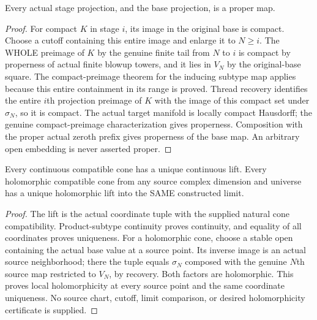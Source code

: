 \begin{theorem}
\label{hir:actual-thread-lf-proper-projections}
\leanok
{}
Every actual stage projection, and the base projection, is a proper map.
\end{theorem}
\begin{proof}
For compact $K$ in stage $i$, its image in the original base is compact.
Choose a cutoff containing this entire image and enlarge it to $N\geq i$.
The WHOLE preimage of $K$ by the genuine finite tail from $N$ to $i$ is compact
by properness of actual finite blowup towers, and it lies in $V_N$ by the
original-base square. The compact-preimage theorem for the inducing subtype
map applies because this entire containment in its range is proved.
Thread recovery identifies the entire $i$th projection preimage of $K$ with
the image of this compact set under $\sigma_N$, so it is compact.
The actual target manifold is locally compact Hausdorff; the genuine
compact-preimage characterization gives properness. Composition with the
proper actual zeroth prefix gives properness of the base map. An arbitrary
open embedding is never asserted proper.
\end{proof}

\begin{theorem}
\label{hir:actual-thread-lf-universal-cones}
\leanok
{}
Every continuous compatible cone has a unique continuous lift. Every
holomorphic compatible cone from any source complex dimension and universe
has a unique holomorphic lift into the SAME constructed limit.
\end{theorem}
\begin{proof}
The lift is the actual coordinate tuple with the supplied natural cone
compatibility. Product-subtype continuity proves continuity, and equality of
all coordinates proves uniqueness. For a holomorphic cone, choose a stable
open containing the actual base value at a source point. Its inverse image
is an actual source neighborhood; there the tuple equals $\sigma_N$ composed
with the genuine $N$th source map restricted to $V_N$, by recovery.
Both factors are holomorphic. This proves local holomorphicity at every
source point and the same coordinate uniqueness. No source chart, cutoff,
limit comparison, or desired holomorphicity certificate is supplied.
\end{proof}

